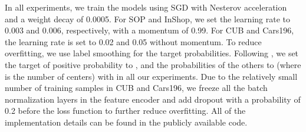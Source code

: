 \documentclass[10pt,twocolumn,letterpaper]{article}
\begin{document}
In all experiments, we train the models using SGD with Nesterov acceleration \cite{nesterov} and a weight decay of 0.0005. For SOP and InShop, we set the learning rate to 0.003 and 0.006, respectively, with a momentum of 0.99. For CUB and Cars196, the learning rate is set to 0.02 and 0.05 without momentum. To reduce overfitting, we use label smoothing \cite{inception} for the target probabilities. Following \cite{ce}, we set the target of positive probability  to , and the probabilities of the others  to  (where  is the number of centers) with  in all our experiments. Due to the relatively small number of training samples in CUB and Cars196, we freeze all the batch normalization layers in the feature encoder and add dropout with a probability of 0.2 before the loss function to further reduce overfitting. All of the implementation details can be found in the publicly available code.
\end{document}
